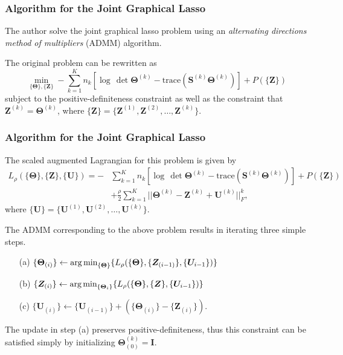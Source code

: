 \documentclass[t]{beamer}
\begin{document}
\begin{frame}
\frametitle{Algorithm for the Joint Graphical Lasso}
The author solve the joint graphical lasso problem using an \textit{alternating directions method of multipliers} (ADMM) algorithm.

\bigskip
\pause
The original problem can be rewritten as
\small
\begin{equation*}
\min_{\{\bm{\Theta}\},\{\bm{Z}\}} -\sum_{k=1}^{K}n_{k}\left[\log\,\det \bm{\Theta}^{(k)}-\mbox{trace}\left(\bm{S}^{(k)}\bm{\Theta}^{(k)}\right)\right] + P(\{\bm{Z}\})
\end{equation*}
\normalsize
subject to the positive-definiteness constraint as well as the constraint that $\bm{Z}^{(k)} = \bm{\Theta}^{(k)}$, where $\{\bm{Z}\} = \{\bm{Z}^{(1)},\bm{Z}^{(2)},\ldots,\bm{Z}^{(k)}\}$.
\end{frame}


\begin{frame}
\frametitle{Algorithm for the Joint Graphical Lasso}
The scaled augmented Lagrangian for this problem is given by
\footnotesize
\begin{align*}
L_{\rho}(\{\bm{\Theta}\},\{\bm{Z}\},\{\bm{U}\}) =  -&\sum_{k=1}^{K}n_{k}\left[\log\,\det \bm{\Theta}^{(k)}-\mbox{trace}\left(\bm{S}^{(k)}\bm{\Theta}^{(k)}\right)\right] + P(\{\bm{Z}\}) \\
&+ \frac{\rho}{2}\sum_{k=1}^{K}||\bm{\Theta}^{(k)}-\bm{Z}^{(k)} + \bm{U}^{(k)}||_{F}^{k},
\end{align*}
\normalsize
where $\{\bm{U}\} = \{\bm{U}^{(1)},\bm{U}^{(2)},\ldots,\bm{U}^{(k)}\}$.

\bigskip
\pause
The ADMM corresponding to the above problem results in iterating three simple steps. 
\begin{itemize}
	\item[(a)] $\{\bm{\Theta}_{(i)}\} \leftarrow \mbox{arg\,min}_{\{\bm{\Theta}\}}\{L_{\rho}(\{\bm{\Theta}\},\{\bm{Z}_{(i-1)}\},\{\bm{U}_{i-1}\})\}$
	
	\smallskip
	\item[(b)] $\{\bm{Z}_{(i)}\} \leftarrow \mbox{arg\,min}_{\{\bm{\Theta}_{i}\}}\{L_{\rho}(\{\bm{\Theta}\},\{\bm{Z}\},\{\bm{U}_{i-1}\})\}$
	
	\smallskip
	\item[(c)] $\{\bm{U}_{(i)}\} \leftarrow \{\bm{U}_{(i-1)}\} + (\{\bm{\Theta}_{(i)}\} - \{\bm{Z}_{(i)}\})$.	
\end{itemize}

\bigskip
\pause
The update in step (a) preserves positive-definiteness, thus this constraint can be satisfied simply by initializing $\bm{\Theta}^{(k)}_{(0)} = \bm{I}$.

\end{frame}
\end{document}
